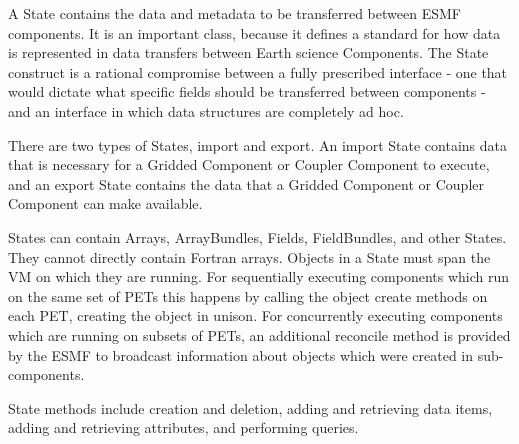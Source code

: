 %


A State contains the data and metadata to be transferred between 
ESMF components.  It is an important class, because it defines a 
standard for how data is represented in data transfers between Earth
science Components.  The 
State construct is a rational compromise between a fully prescribed 
interface - one that would dictate what specific fields should be 
transferred between components - and an interface in which data structures
are completely ad hoc.

There are two types of States, import and export.
An import State contains data that is necessary for a Gridded Component
or Coupler Component to execute, and an export State contains the data
that a Gridded Component or Coupler Component can make available.

States can contain Arrays, ArrayBundles, Fields, FieldBundles, and other States.  They
cannot directly contain Fortran arrays.   Objects in a State must span
the VM on which they are running.  For sequentially executing components
which run on the same set of PETs this happens by calling the object
create methods on each PET, creating the object in unison.   For
concurrently executing components which are running on subsets of PETs,
an additional reconcile method is provided by the ESMF to broadcast information
about objects which were created in sub-components.

State methods include creation and deletion, adding and retrieving 
data items, adding and retrieving attributes, and performing queries.  


